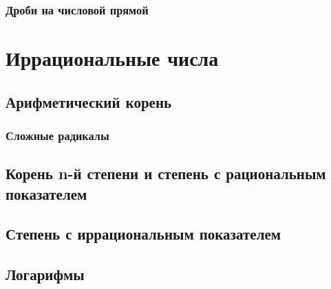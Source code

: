 \documentclass[10pt, a4paper]{article}
\begin{document}
		\subsubsection{Дроби на числовой прямой}
\section{Иррациональные числа}
	\subsection{Арифметический корень}
		\subsubsection{Сложные радикалы}
	\subsection{Корень n-й степени и степень с рациональным показателем}
	\subsection{Степень с иррациональным показателем}
	\subsection{Логарифмы}
\end{document}
